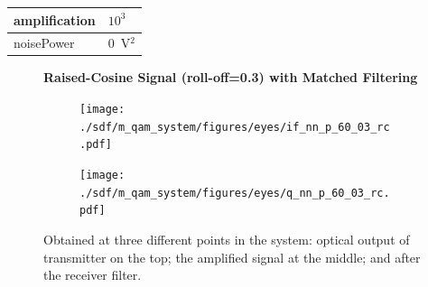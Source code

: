 \begin{refsection}
\begin{table}[H]
\begin{tabular}{|l|l|}
		amplification          & $10^3$                                                     \\ \hline
		noisePower   & $0$~V$^2$                             					\\ \hline
	\end{tabular}
\end{table}
\begin{figure}[H]
	
		\centering
	\textbf{Raised-Cosine Signal (roll-off=0.3) with Matched Filtering}
	\begin{minipage}{\linewidth}
		\centering
	\begin{subfigure}{.45\textwidth}
		\centering
		\texttt{[image: ./sdf/m\_qam\_system/figures/eyes/if\_nn\_p\_60\_03\_rc.pdf]}
	\end{subfigure}
	\begin{subfigure}{.45\textwidth}
		\centering
		\texttt{[image: ./sdf/m\_qam\_system/figures/eyes/q\_nn\_p\_60\_03\_rc.pdf]}
	\end{subfigure}
	
	\caption{
		Obtained at
		three different points in the system: optical output of transmitter on the top;
		the amplified signal at the middle; and
		after the receiver filter.
		\label{fig:eyes_nn_rc_03}}
	\end{minipage}
\end{figure}


\end{refsection}

